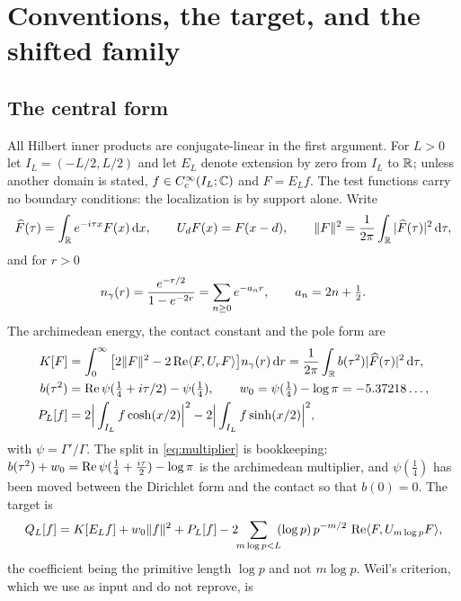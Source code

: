 \section{Conventions, the target, and the shifted family}\label{sec:conventions}

\subsection{The central form}

All Hilbert inner products are conjugate-linear in the first argument. For $L>0$
let $I_L=(-L/2,L/2)$ and let $E_L$ denote extension by zero from $I_L$ to $\mathbb R$;
unless another domain is stated, $f\in C_c^\infty(I_L;\mathbb C)$ and $F=E_Lf$. The test
functions carry no boundary conditions: the localization is by support alone.
Write
\begin{equation}\label{eq:fourier}
 \widehat F(\tau)=\int_\mathbb R e^{-i\tau x}F(x)\,\mathrm d x,\qquad
 U_dF(x)=F(x-d),\qquad
 \lVert F\rVert^2=\frac1{2\pi}\int_\mathbb R|\widehat F(\tau)|^2\,\mathrm d\tau,
\end{equation}
and for $r>0$
\begin{equation}\label{eq:gamma-kernel}
 n_{\gamma}(r)=\frac{e^{-r/2}}{1-e^{-2r}}=\sum_{n\geq0}e^{-a_nr},
 \qquad a_n=2n+\tfrac12 .
\end{equation}
The archimedean energy, the contact constant and the pole form are
\begin{align}
 K[F]&=\int_0^\infty\big[2\lVert F\rVert^2-2\operatorname{Re}\langle F,U_rF\rangle\big]n_{\gamma}(r)\,\mathrm d r
  =\frac1{2\pi}\int_\mathbb R b(\tau^2)|\widehat F(\tau)|^2\,\mathrm d\tau,
 \label{eq:gamma-energy}\\
 b(\tau^2)&=\operatorname{Re}\psi(\tfrac14+i\tau/2)-\psi(\tfrac14),\qquad
 w_0=\psi(\tfrac14)-\log\pi=-5.37218\ldots,
 \label{eq:multiplier}\\
 P_L[f]&=2\Big|\int_{I_L}f\cosh(x/2)\Big|^2
        -2\Big|\int_{I_L}f\sinh(x/2)\Big|^2 ,
 \label{eq:poles}
\end{align}
with $\psi=\Gamma'/\Gamma$. The split in \eqref{eq:multiplier} is bookkeeping:
$b(\tau^2)+w_0=\operatorname{Re}\psi(\frac14+\frac{i\tau}2)-\log\pi$ is the archimedean
multiplier, and $\psi(\frac14)$ has been moved between the Dirichlet form and the
contact so that $b(0)=0$. The target is
\begin{equation}\label{eq:target}
 Q_L[f]=K[E_Lf]+w_0\lVert f\rVert^2+P_L[f]
 -2\!\!\sum_{m\log p<L}\!\!(\log p)\,p^{-m/2}\,\operatorname{Re}\langle F,U_{m\log p}F\rangle,
\end{equation}
the coefficient being the primitive length $\log p$ and not $m\log p$. Weil's
criterion, which we use as input and do not reprove, is
